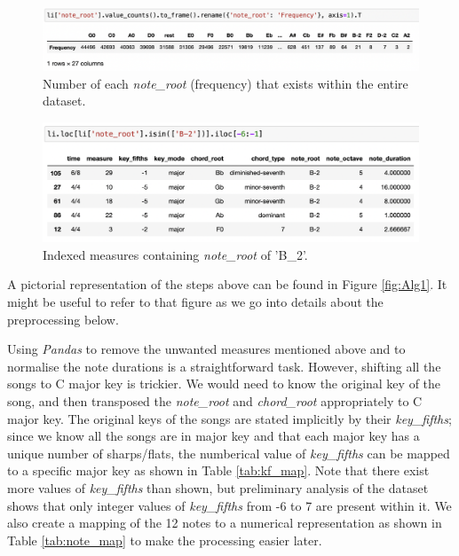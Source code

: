 \begin{figure}
    \centering
    \includegraphics[scale=0.5]{Figures/note frequency}
    \decoRule
    \caption{Number of each \emph{note\_root} (frequency) that exists within the entire dataset.}
    \label{fig:notefreq}
    \end{figure}
    
    \begin{figure}
        \centering
        \includegraphics[scale=0.5]{Figures/irregular notes}
        \decoRule
        \caption{Indexed measures containing \emph{note\_root} of 'B\_2'.}
        \label{fig:irregnote}
        \end{figure}
        
A pictorial representation of the steps above can be found in Figure \ref{fig:Alg1}. It might be useful to refer to that figure as we go into details about the preprocessing below.

Using \emph{Pandas} to remove the unwanted measures mentioned above and to normalise the note durations is a straightforward task. However, shifting all the songs to C major key is trickier. We would need to know the original key of the song, and then transposed the \emph{note\_root} and \emph{chord\_root} appropriately to C major key. The original keys of the songs are stated implicitly by their \emph{key\_fifths}; since we know all the songs are in major key and that each major key has a unique number of sharps/flats, the numberical value of \emph{key\_fifths} can be mapped to a specific major key as shown in Table \ref{tab:kf_map}. Note that there exist more values of \emph{key\_fifths} than shown, but preliminary analysis of the dataset shows that only integer values of \emph{key\_fifths} from -6 to 7 are present within it. We also create a mapping of the 12 notes to a numerical representation as shown in Table \ref{tab:note_map} to make the processing easier later.

